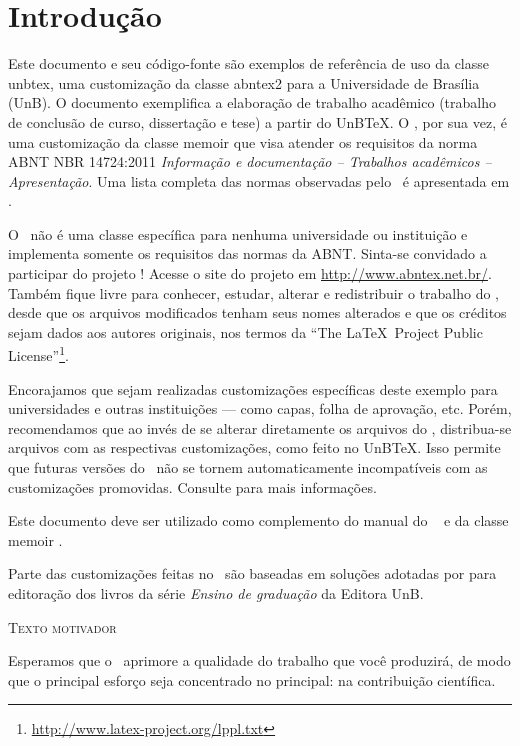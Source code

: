 \chapter{Introdução}
\label{cap_intr}

Este documento e seu código-fonte são exemplos de referência de uso da classe \textsf{unbtex}, uma customização da classe \textsf{abntex2} para a Universidade de Brasília (UnB). O documento exemplifica a elaboração de trabalho acadêmico (trabalho de conclusão de curso, dissertação e tese) a partir do UnB\TeX. O \abnTeX, por sua vez, é uma customização da classe \textsf{memoir} que visa atender os requisitos da norma ABNT NBR 14724:2011 \emph{Informação e documentação -- Trabalhos acadêmicos -- Apresentação}. Uma lista completa das normas observadas pelo \abnTeX\ é apresentada em \textcite{abntex2classe}.


O \abnTeX\ não é uma classe específica para nenhuma universidade ou instituição e implementa somente os requisitos das normas da ABNT. Sinta-se convidado a participar do projeto \abnTeX! Acesse o site do projeto em \url{http://www.abntex.net.br/}. Também fique livre para conhecer, estudar, alterar e redistribuir o trabalho do \abnTeX, desde que os arquivos modificados tenham seus nomes alterados e que os créditos sejam dados aos autores originais, nos termos da ``The \LaTeX\ Project Public License''\footnote{\url{http://www.latex-project.org/lppl.txt}}.

Encorajamos que sejam realizadas customizações específicas deste exemplo para universidades e outras instituições --- como capas, folha de aprovação, etc. Porém, recomendamos que ao invés de se alterar diretamente os arquivos do \abnTeX, distribua-se arquivos com as respectivas customizações, como feito no UnB\TeX. Isso permite que futuras versões do \abnTeX~não se tornem automaticamente incompatíveis com as customizações promovidas. Consulte \textcite{abntex2-wiki-como-customizar} para mais informações.

Este documento deve ser utilizado como complemento do manual do \abnTeX\ \cite{abntex2classe} e da classe \textsf{memoir} \cite{memoir}. 

Parte das customizações feitas no \abnTeX\ são baseadas em soluções adotadas por \textcite{Castro2019} para editoração dos livros da série \textit{Ensino de graduação} da Editora UnB.

\begin{mdframed}[style=plainSty] %

{\center \textsc{Texto motivador} \par}

\noindent Esperamos que o \abnTeX\ aprimore a qualidade do trabalho que você produzirá, de modo que o principal esforço seja concentrado no principal: na contribuição científica.
   
\end{mdframed}